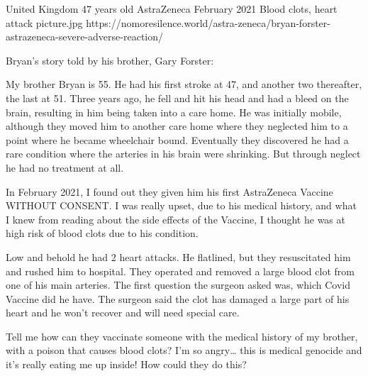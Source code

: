 {United Kingdom}
{47 years old}
{AstraZeneca}
{February 2021}
{Blood clots, heart attack}
{picture.jpg}
{https://nomoresilence.world/astra-zeneca/bryan-forster-astrazeneca-severe-adverse-reaction/}
{

Bryan’s story told by his brother, Gary Forster:

My brother Bryan is 55. He had his first stroke at 47, and another two
thereafter, the last at 51. Three years ago, he fell and hit his head and had a
bleed on the brain, resulting in him being taken into a care home. He was
initially mobile, although they moved him to another care home where they
neglected him to a point where he became wheelchair bound. Eventually they
discovered he had a rare condition where the arteries in his brain were
shrinking. But through neglect he had no treatment at all.

In February 2021, I found out they given him his first AstraZeneca Vaccine
WITHOUT CONSENT. I was really upset, due to his medical history, and what I knew
from reading about the side effects of the Vaccine, I thought he was at high
risk of blood clots due to his condition.

Low and behold he had 2 heart attacks. He flatlined, but they resuscitated him
and rushed him to hospital. They operated and removed a large blood clot from
one of his main arteries. The first question the surgeon asked was, which Covid
Vaccine did he have. The surgeon said the clot has damaged a large part of his
heart and he won’t recover and will need special care.

Tell me how can they vaccinate someone with the medical history of my brother,
with a poison that causes blood clots? I’m so angry… this is medical genocide
and it’s really eating me up inside! How could they do this?

}
